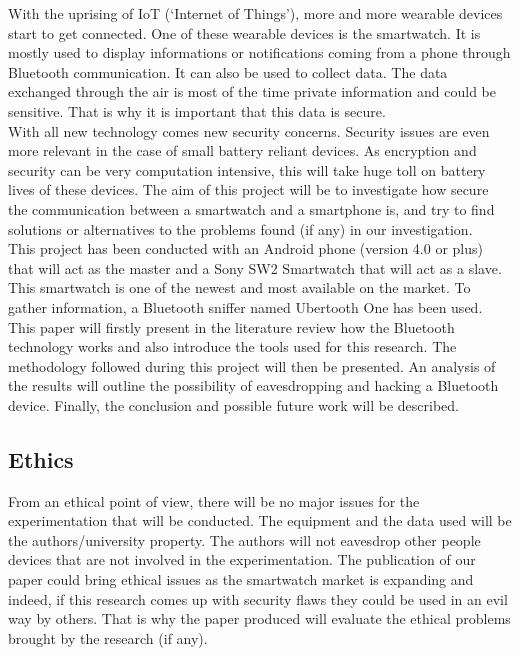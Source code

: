 
With the uprising of IoT (‘Internet of Things’), more and more wearable devices start to get connected. One of these wearable devices is the smartwatch. It is mostly used to display informations or notifications coming from a phone through Bluetooth communication. It can also be used to collect data. The data exchanged through the air is most of the time private information and could be sensitive. That is why it is important that this data is secure.\\

With all new technology comes new security concerns. Security issues are even more relevant in the case of small battery reliant devices. As encryption and security can be very computation intensive, this will take huge toll on battery lives of these devices. The aim of this project will be to investigate how secure the communication between a smartwatch and a smartphone is, and try to find solutions or alternatives to the problems found (if any) in our investigation.\\

This project has been conducted with an Android phone (version 4.0 or plus) that will act as the master and a Sony SW2 Smartwatch that will act as a slave. This smartwatch is one of the newest and most available on the market. To gather information, a Bluetooth sniffer named Ubertooth One has been used.\\

This paper will firstly present in the literature review  how the Bluetooth technology works and also introduce the tools used for this research. The methodology followed during this project will then be presented. An analysis of the results will outline the possibility of eavesdropping and hacking a Bluetooth device. Finally, the conclusion and possible future work will be described.

\subsection{Ethics}
From an ethical point of view, there will be no major issues for the experimentation that will be conducted. The equipment and the data used will be the authors/university property. The authors will not eavesdrop other people devices that are not involved in the experimentation.
The publication of our paper could bring ethical issues as the smartwatch market is expanding and indeed, if this research comes up with security flaws they could be used in an evil way by others. That is why the paper produced will evaluate the ethical problems brought by the research (if any).
\newpage
